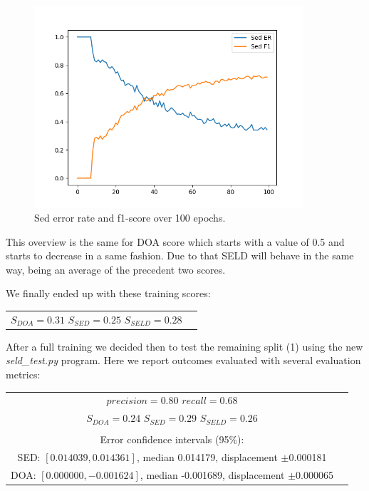 \documentclass[11pt]{article}
\begin{document}
\newpage
\begin{figure}[h!]
	\centering
	\includegraphics[width=10cm]{img/er_f1.png}
	\caption{Sed error rate and f1-score over 100 epochs.}
	\label{fig:erf1}
\end{figure}

\noindent
This overview is the same for DOA score which starts with a value of 0.5 and starts to decrease in a same fashion. Due to that SELD will behave in the same way, being an average of the precedent two scores.

\noindent
We finally ended up with these training scores:

\begin{center}
\begin{tabular}{cp{}}
$S_{DOA} = 0.31$ \space\space $S_{SED} = 0.25$ \space\space $S_{SELD} = 0.28$
\end{tabular}
\end{center}

\noindent
After a full training we decided then to test the remaining split (1) using the new \textit{seld\_test.py} program. Here we report outcomes evaluated with several evaluation metrics:
\begin{center}
\begin{tabular}{cp{}}
$precision = 0.80$ \space\space $recall = 0.68$\\
$S_{DOA} = 0.24$ \space\space $S_{SED} = 0.29$ \space\space $S_{SELD} = 0.26$\\
\\
Error confidence intervals (95\%):\\
SED: $[0.014039, 0.014361]$, median 0.014179, displacement $\pm$0.000181\\
DOA: $[0.000000, -0.001624]$, median -0.001689, displacement $\pm$0.000065

\end{tabular}
\end{center}
\end{document}
